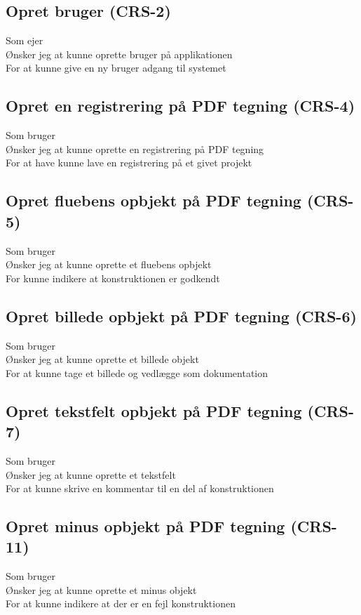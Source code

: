 	\subsection*{Opret bruger (CRS-2)}
	Som ejer\\
	Ønsker jeg at kunne oprette bruger på applikationen\\
	For at kunne give en ny bruger adgang til systemet
	
	\subsection*{Opret en registrering på PDF tegning (CRS-4)}
	Som bruger\\
	Ønsker jeg at kunne oprette en registrering på PDF tegning\\
	For at have kunne lave en registrering på et givet projekt 
	
	\subsection*{Opret fluebens opbjekt på PDF tegning (CRS-5)}
	Som bruger \\
	Ønsker jeg at kunne oprette et fluebens opbjekt\\
	For kunne indikere at konstruktionen er godkendt 

	\subsection*{Opret billede opbjekt på PDF tegning (CRS-6)}
	Som bruger\\
	Ønsker jeg at kunne oprette et billede objekt\\
	For at kunne tage et billede og vedlægge som dokumentation 
	
	\subsection*{Opret tekstfelt opbjekt på PDF tegning (CRS-7)}
	Som bruger\\
	Ønsker jeg at kunne oprette et tekstfelt\\
	For at kunne skrive en kommentar til en del af konstruktionen 
	
	\subsection*{Opret minus opbjekt på PDF tegning (CRS-11)}
	Som bruger\\
	Ønsker jeg at kunne oprette et minus objekt\\
	For at kunne indikere at der er en fejl konstruktionen


